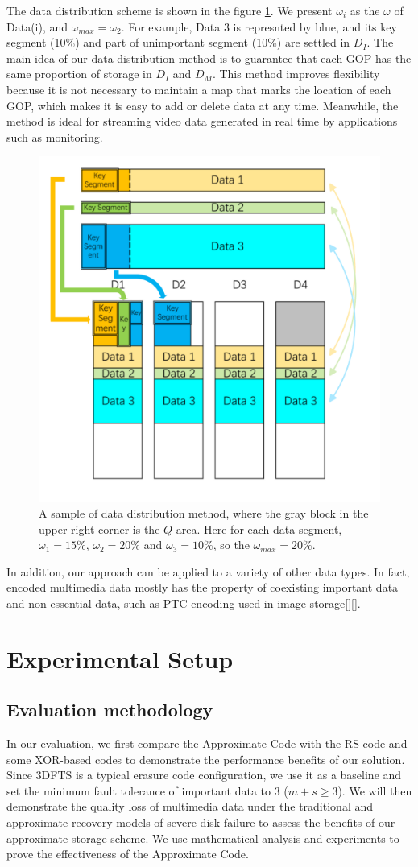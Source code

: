 \documentclass[sigconf]{acmart}
\begin{document}
The data distribution scheme is shown in the figure \ref{Data-distribution-v2}. We present $\omega_i$ as the $\omega$ of Data(i), and $\omega_{max} = \omega_2$.
For example, Data 3 is represnted by blue, and its key segment (10\%) and part of unimportant segment (10\%) are settled in $D_I$.
The main idea of our data distribution method is to guarantee that each GOP has the same proportion of storage in $D_I$ and $D_M$. This method improves flexibility because it is not necessary to maintain a map that marks the location of each GOP, which makes it is easy to add or delete data at any time. Meanwhile, the method is ideal for streaming video data generated in real time by applications such as monitoring.

\begin{figure}[htb]
\centering
\includegraphics[width=0.32 \textwidth]{photo/Data-distribution-v2.pdf}
\caption{A sample of data distribution method, where the gray block in the upper right corner is the $Q$ area. Here for each data segment, $\omega_1=15\%$, $\omega_2=20\%$ and $\omega_3=10\%$, so the $\omega_{max}=20\%$.}
\label{Data-distribution-v2}
\end{figure}

In addition, our approach can be applied to a variety of other data types. In fact, encoded multimedia data mostly has the property of coexisting important data and non-essential data, such as PTC encoding used in image storage[][].

\section{Experimental Setup}

\subsection{Evaluation methodology}
In our evaluation, we first compare the Approximate Code with the RS code and some XOR-based codes to demonstrate the performance benefits of our solution. Since 3DFTS is a typical erasure code configuration, we use it as a baseline and set the minimum fault tolerance of important data to 3 ($ m + s \geqslant 3 $). We will then demonstrate the quality loss of multimedia data under the traditional and approximate recovery models of severe disk failure to assess the benefits of our approximate storage scheme. We use mathematical analysis and experiments to prove the effectiveness of the Approximate Code.
\end{document}
